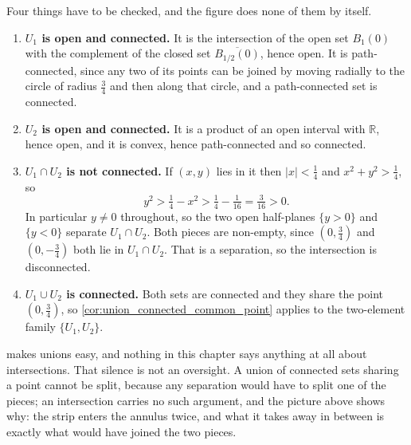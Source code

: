 \begin{exercisesolution}
\begin{center}
\end{center}

Four things have to be checked, and the figure does none of them by itself.

\begin{enumerate}[label=\textbf{(\alph*)}]
  \item \textbf{$U_1$ is open and connected.} It is the intersection of the open set $B_1(0)$
    with the complement of the closed set $\overline{B_{1/2}(0)}$, hence open. It is
    path-connected, since any two of its points can be joined by moving radially to the circle of
    radius $\tfrac34$ and then along that circle, and a path-connected set is connected.
  \item \textbf{$U_2$ is open and connected.} It is a product of an open interval with
    $\mathbb{R}$, hence open, and it is convex, hence path-connected and so connected.
  \item \textbf{$U_1\cap U_2$ is not connected.} If $(x,y)$ lies in it then $\lvert x\rvert <
    \tfrac14$ and $x^2+y^2 > \tfrac14$, so
    \[y^2 > \tfrac14 - x^2 > \tfrac14 - \tfrac1{16} = \tfrac3{16} > 0 .\]
    In particular $y \neq 0$ throughout, so the two open half-planes $\{y>0\}$ and $\{y<0\}$
    separate $U_1\cap U_2$. Both pieces are non-empty, since $(0,\tfrac34)$ and $(0,-\tfrac34)$
    both lie in $U_1\cap U_2$. That is a separation, so the intersection is disconnected.
  \item \textbf{$U_1\cup U_2$ is connected.} Both sets are connected and they share the point
    $(0,\tfrac34)$, so \cref{cor:union_connected_common_point} applies to the two-element family
    $\{U_1,U_2\}$.
\end{enumerate}

\begin{remark}
 makes unions easy, and nothing in this chapter says
anything at all about intersections. That silence is not an oversight. A union of connected sets
sharing a point cannot be split, because any separation would have to split one of the pieces;
an intersection carries no such argument, and the picture above shows why: the strip enters the
annulus twice, and what it takes away in between is exactly what would have joined the two
pieces.


\end{remark}
\end{exercisesolution}
